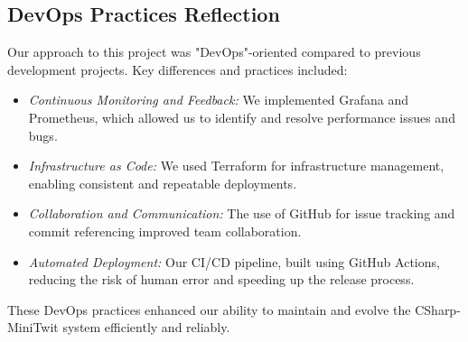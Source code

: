 \subsection{DevOps Practices Reflection}

Our approach to this project was "DevOps"-oriented compared to previous development projects. Key differences and practices included:
\begin{itemize}
    \item \textit{Continuous Monitoring and Feedback:} We implemented Grafana and Prometheus, which allowed us to identify and resolve performance issues and bugs.
    \item \textit{Infrastructure as Code:} We used Terraform for infrastructure management, enabling consistent and repeatable deployments.
    \item \textit{Collaboration and Communication:} The use of GitHub for issue tracking and commit referencing improved team collaboration.
    \item \textit{Automated Deployment:} Our CI/CD pipeline, built using GitHub Actions, reducing the risk of human error and speeding up the release process.
\end{itemize}

\noindent These DevOps practices enhanced our ability to maintain and evolve the CSharp-MiniTwit system efficiently and reliably.
